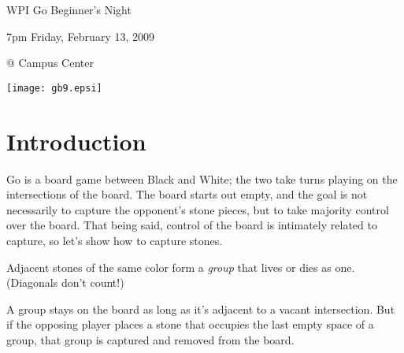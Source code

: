 \documentclass{article}
\begin{document}
\centerline{\Huge WPI Go Beginner's Night}
\centerline{\Huge 7pm Friday, February 13, 2009}
\centerline{\Huge @ Campus Center}
\vfill

\begin{center}
\texttt{[image: gb9.epsi]}
\end{center}

\vfill

\newpage

\section*{Introduction}
Go is a board game between Black and White; the two take turns playing
on the intersections of the board.  The board starts out empty, and
the goal is not necessarily to capture the opponent's stone pieces, but to
take majority control over the board.  That being said, control of the
board is intimately related to capture, so let's show how to capture
stones.

Adjacent stones of the same color form a \emph{group} that lives or
dies as one.  (Diagonals don't count!)

\begin{center}
\cleargoban
{}
\hspace{.5in}%
\hspace{.5in}%
\end{center}
%
A group stays on the board as long as it's adjacent to a vacant
intersection.  But if the opposing player places a stone that occupies
the last empty space of a group, that group is captured and removed
from the board.


\begin{center}
\end{center}
\end{document}

